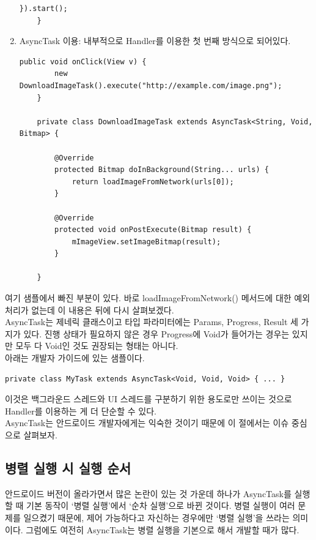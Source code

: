 \begin{enumerate}
\begin{lstlisting}[frame=single]
    	}).start();
	}
\end{lstlisting}
	
\item AsyncTask 이용: 내부적으로 Handler를 이용한 첫 번째 방식으로 되어있다.
\begin{lstlisting}[frame=single]
	public void onClick(View v) {
    	new DownloadImageTask().execute("http://example.com/image.png");
	}

	private class DownloadImageTask extends AsyncTask<String, Void, Bitmap> {
	
		@Override
    	protected Bitmap doInBackground(String... urls) {
        	return loadImageFromNetwork(urls[0]);
    	}

      	@Override
    	protected void onPostExecute(Bitmap result) {
        	mImageView.setImageBitmap(result);
    	}
    	
	}	
\end{lstlisting}
\end{enumerate}
여기 샘플에서 빠진 부분이 있다. 바로 loadImageFromNetwork() 메서드에 대한 예외 처리가 없는데 이 내용은 뒤에 다시 살펴보겠다.\\

AsyncTask는 제네릭 클래스이고 타입 파라미터에는 Params, Progress, Result 세 가지가 있다. 진행 상태가 필요하지 않은 경우 Progress에 Void가 들어가는 경우는 있지만 모두 다 Void인 것도 권장되는 형태는 아니다.\\

아래는 개발자 가이드에 있는 샘플이다.
\begin{lstlisting}[frame=single]
private class MyTask extends AsyncTask<Void, Void, Void> { ... }
\end{lstlisting}
이것은 백그라운드 스레드와 UI 스레드를 구분하기 위한 용도로만 쓰이는 것으로 Handler를 이용하는 게 더 단순할 수 있다.\\

AsyncTask는 안드로이드 개발자에게는 익숙한 것이기 때문에 이 절에서는 이슈 중심으로 살펴보자.

\subsection{병렬 실행 시 실행 순서}
안드로이드 버전이 올라가면서 많은 논란이 있는 것 가운데 하나가 AsyncTask를 실행할 때 기본 동작이 `병렬 실행'에서 `순차 실행'으로 바뀐 것이다. 
병렬 실행이 여러 문제를 일으켰기 때문에, 제어 가능하다고 자신하는 경우에만 `병렬 실행'을 쓰라는 의미이다.
그럼에도 여전히 AsyncTask는 병렬 실행을 기본으로 해서 개발할 때가 많다.\\

